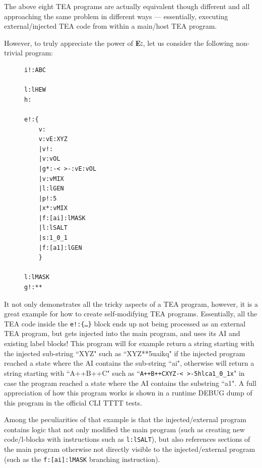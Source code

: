 \documentclass[a4paper, 18pt]{book} %
\begin{document}
The above eight TEA programs are actually equivalent though different and all approaching the same problem in different ways --- essentially, executing external/injected TEA code from within a main/host TEA program. 

\vspace{1em}

However, to truly appreciate the power of \textbf{E:}, let us consider the following non-trivial program:


\begin{figure}[H]
 \Large
  \centering
  \begin{tcolorbox}[teaterminalstyle, title=Non-Trivial Injection and Context-Aware Evaluation]
  \begin{lstlisting}[language=TEA]
i!:ABC

l:lHEW
h:

e!:{
    v:
    v:vE:XYZ
    |v!:
    |v:vOL
    |g*:-< >-:vE:vOL
    |v:vMIX
    |l:lGEN
    |p!:5
    |x*:vMIX
    |f:[ai]:lMASK
    |l:lSALT
    |s:1_0_1
    |f:[a1]:lGEN
    }

l:lMASK
g!:**  
   \end{lstlisting}
  \end{tcolorbox}
\end{figure}


It not only demonstrates all the tricky aspects of a TEA program, however, it is a great example for how to create self-modifying TEA programs. Essentially, all the TEA code inside the \texttt{e!:\{…\}} block ends up not being processed as an external TEA program, but gets injected into the main program, and uses its AI and existing label blocks! This program will for example return a string starting with the injected sub-string ``XYZ" such as ``XYZ**5uaikq" if the injected program reached a state where the AI contains the sub-string ``ai", otherwise will return a string starting with ``A++B++C" such as ``\verb$A++B++CXYZ-< >-5hlca1_0_1x$" in case the program reached a state where the AI contains the substring ``a1". A full appreciation of how this program works is shown in a runtime DEBUG dump of this program in the official CLI TTTT tests\cite{cli_tttt}.

\vspace{1em}

Among the peculiarities of that example is that the injected/external program contains logic that not only modified the main program (such as creating new code/l-blocks with instructions such as \texttt{l:lSALT}), but also references sections of the main program otherwise not directly visible to the injected/external program (such as the \texttt{f:[ai]:lMASK} branching instruction).
\end{document}
